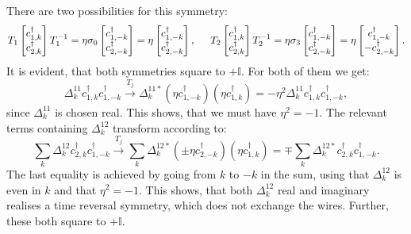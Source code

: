 There are two possibilities for this symmetry: 
\begin{equation}
T_1 \begin{bmatrix} c^\dagger_{1,k} \\ c^\dagger_{2,k} \end{bmatrix} T_1^{-1} = \eta\sigma_0 \begin{bmatrix} c^\dagger_{1,-k} \\ c^\dagger_{2,-k} \end{bmatrix} = \eta\begin{bmatrix} c^\dagger_{1,-k} \\ c^\dagger_{2,-k} \end{bmatrix}, \hspace{0.5cm} T_2 \begin{bmatrix} c^\dagger_{1,k} \\ c^\dagger_{2,k} \end{bmatrix} T_2^{-1} = \eta\sigma_3 \begin{bmatrix} c^\dagger_{1,-k} \\ c^\dagger_{2,-k} \end{bmatrix} = \eta\begin{bmatrix} c^\dagger_{1,-k} \\  - c^\dagger_{2,-k} \end{bmatrix}. \nonumber
\end{equation} 
It is evident, that both symmetries square to $+\mathbb{I}$. For both of them we get: 
\begin{equation}
\Delta^{11}_k c^\dagger_{1,k}c^\dagger_{1,-k} \overset{T_j}{\to} \Delta^{11*}_k \left(\eta c^\dagger_{1,-k}\right)\left(\eta c^\dagger_{1,k}\right) = -\eta^2\Delta^{11}_k c^\dagger_{1,k}c^\dagger_{1,-k}, \nonumber
\end{equation}
since $\Delta^{11}_k$ is chosen real. This shows, that we must have $\eta^2 = -1$. The relevant terms containing $\Delta^{12}_k$ transform according to:
\begin{equation}
\sum_k \Delta^{12}_k c^\dagger_{2,k}c^\dagger_{1,-k} \overset{T_j}{\to} \sum_k \Delta^{12*}_k \left(\pm \eta c^\dagger_{2,-k}\right)\left( \eta c^\dagger_{1,k}\right) = \mp \sum_k \Delta^{12*}_{k} c^\dagger_{2,k}c^\dagger_{1,-k}. \nonumber
\end{equation}
The last equality is achieved by going from $k$ to $-k$ in the sum, using that $\Delta^{12}_k$ is even in $k$ and that $\eta^2 = -1$. This shows, that both $\Delta^{12}_k$ real and imaginary realises a time reversal symmetry, which does not exchange the wires. Further, these both square to $+\mathbb{I}$.

